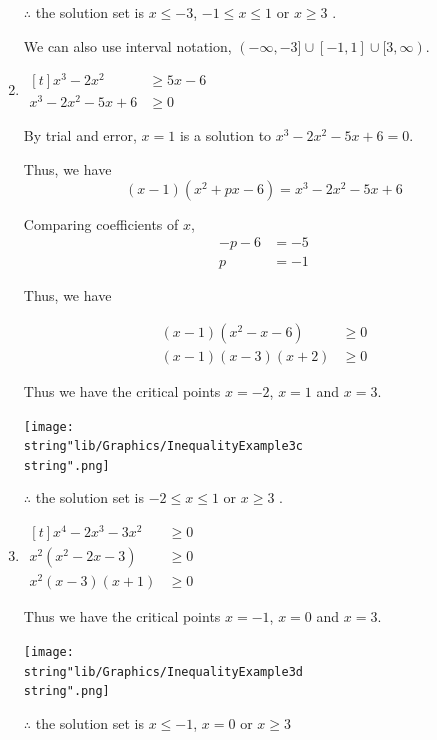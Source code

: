 \documentclass[11pt,a4paper]{book}
\begin{document}
\begin{example}{}
\begin{enumerate}[label=(\alph*)]
$\therefore$ the solution set is $x\leq-3$, $-1\leq x\leq1$ or
$x\geq3$ .

We can also use interval notation, $(-\infty,-3]\cup\left[-1,1\right]\cup[3,\infty)$.

\item
$
\begin{aligned}[t]
x^{3}-2x^{2} & \geq5x-6\\
x^{3}-2x^{2}-5x+6 & \geq0
\end{aligned}
$

By trial and error, $x=1$ is a solution to $x^{3}-2x^{2}-5x+6=0$.

Thus, we have
\[
\left(x-1\right)\left(x^{2}+px-6\right)=x^{3}-2x^{2}-5x+6
\]

Comparing coefficients of $x$,
\begin{align*}
-p-6 & =-5\\
p & =-1
\end{align*}

\newpage

Thus, we have

\begin{align*}
\left(x-1\right)\left(x^{2}-x-6\right) & \geq0\\
\left(x-1\right)\left(x-3\right)\left(x+2\right) & \geq0
\end{align*}


Thus we have the critical points $x=-2$, $x=1$ and $x=3$.
\begin{center}
\texttt{[image: \\string"lib/Graphics/InequalityExample3c\\string".png]}
\par\end{center}

$\therefore$ the solution set is $-2\leq x\leq1$ or $x\geq3$ .

\item
$
\begin{aligned}[t]
x^{4}-2x^{3}-3x^{2} & \geq0\\
x^{2}\left(x^{2}-2x-3\right) & \geq0\\
x^{2}\left(x-3\right)\left(x+1\right) & \geq0
\end{aligned}
$

Thus we have the critical points $x=-1$, $x=0$ and $x=3$.
\begin{center}
\texttt{[image: \\string"lib/Graphics/InequalityExample3d\\string".png]}
\par\end{center}

$\therefore$ the solution set is $x\leq-1$, $x=0$ or $x\geq3$

\end{enumerate}
\end{example}
\end{document}
